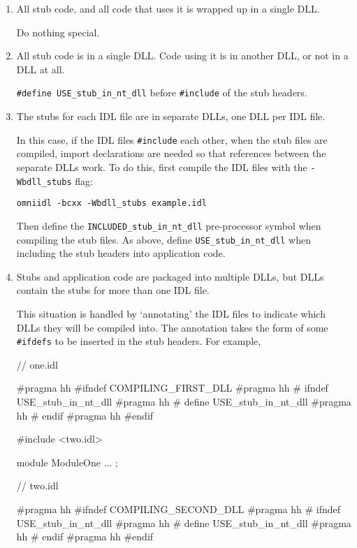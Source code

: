 \documentclass[11pt,twoside,a4paper]{book}
\newcommand{\code}[1]{\texttt{#1}}
\newcommand{\cmdline}[1]{\texttt{#1}}
\begin{document}
\begin{enumerate}

\item All stub code, and all code that uses it is wrapped up in a
      single DLL.

      Do nothing special.

\item All stub code is in a single DLL. Code using it is in another
      DLL, or not in a DLL at all.

      \code{\#define USE\_stub\_in\_nt\_dll} before \code{\#include} of
      the stub headers.

\item The stubs for each IDL file are in separate DLLs, one DLL per
      IDL file.

      In this case, if the IDL files \code{\#include} each other, when
      the stub files are compiled, import declarations are needed so
      that references between the separate DLLs work. To do this,
      first compile the IDL files with the \cmdline{-Wbdll\_stubs}
      flag:

      \cmdline{omniidl -bcxx -Wbdll\_stubs example.idl}

      Then define the \code{INCLUDED\_stub\_in\_nt\_dll} pre-processor
      symbol when compiling the stub files. As above, define
      \code{USE\_stub\_in\_nt\_dll} when including the stub headers
      into application code.

\item Stubs and application code are packaged into multiple DLLs, but
      DLLs contain the stubs for more than one IDL file.

      This situation is handled by `annotating' the IDL files to
      indicate which DLLs they will be compiled into. The annotation
      takes the form of some \code{\#ifdefs} to be inserted in the
      stub headers. For example,

\begin{idllisting}
// one.idl

#pragma hh #ifndef COMPILING_FIRST_DLL
#pragma hh # ifndef USE_stub_in_nt_dll
#pragma hh #   define USE_stub_in_nt_dll
#pragma hh # endif
#pragma hh #endif

#include <two.idl>

module ModuleOne {
  ...
};


// two.idl

#pragma hh #ifndef COMPILING_SECOND_DLL
#pragma hh # ifndef USE_stub_in_nt_dll
#pragma hh #   define USE_stub_in_nt_dll
#pragma hh # endif
#pragma hh #endif


\end{idllisting}
\end{enumerate}
\end{document}

